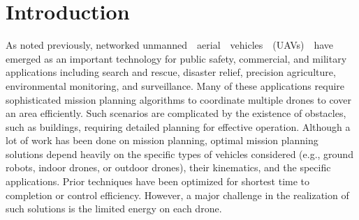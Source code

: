 \section{Introduction}
\label{sec:ch4:intro}
As noted previously, networked unmanned~~aerial~~vehicles~~(UAVs)~~have emerged as an important technology for public safety, commercial, and military applications including search and rescue, disaster relief, precision agriculture, environmental monitoring, and surveillance. Many of these applications require sophisticated mission planning algorithms to coordinate multiple drones to cover an area efficiently. Such scenarios are complicated by the existence of obstacles, such as buildings, requiring detailed planning for effective operation. Although a lot of work has been done on mission planning, optimal mission planning solutions depend heavily on the specific types of vehicles considered (e.g., ground robots, indoor drones, or outdoor drones), their kinematics, and the specific applications. Prior techniques have been optimized for shortest time to completion or control efficiency. However, a major challenge in the realization of such solutions is the limited energy on each drone. 

